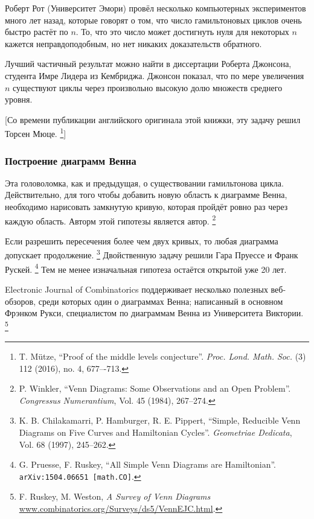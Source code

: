 Роберт Рот (Университет Эмори) провёл несколько компьютерных экспериментов много лет назад, которые говорят о том, что число гамильтоновых циклов очень быстро растёт по $n$.
То, что это число может достигнуть нуля для некоторых $n$ кажется неправдоподобным, но нет никаких доказательств обратного.

Лучший частичный результат можно найти в диссертации Роберта Джонсона, студента Имре Лидера из Кембриджа.
Джонсон показал, что по мере увеличения $n$ существуют циклы через произвольно высокую долю множеств среднего уровня.

[Со времени публикации английского оригинала этой книжки, эту задачу решил Торсен Мюце.
\footnote{T. Mütze, 
``Proof of the middle levels conjecture''.
\emph{Proc. Lond. Math. Soc.} (3) 112 (2016), no. 4, 677–-713.}]

\subsubsection*{Построение диаграмм Венна}

Эта головоломка, как и предыдущая, о существовании гамильтонова цикла. 
Действительно, для того чтобы добавить новую область к диаграмме Венна, необходимо нарисовать замкнутую кривую, которая пройдёт ровно раз через каждую область.
Авторм этой гипотезы является автор.%
\footnote{P. Winkler, ``Venn Diagrams: Some Observations and an Open Problem''. \emph{Congressus Numerantium}, Vol. 45 (1984), 267--274.}

Если разрешить пересечения более чем двух кривых, то любая диаграмма допускает продолжение.%
\footnote{K. B. Chilakamarri, P. Hamburger, R. E. Pippert,
``Simple, Reducible Venn Diagrams on Five Curves and Hamiltonian Cycles''. \emph{Geometriae Dedicata}, Vol. 68 (1997), 245--262.}
Двойственную задачу решили Гара Пруессе и Франк Рускей.%
\footnote{
G. Pruesse, F. Ruskey,
``All Simple Venn Diagrams are Hamiltonian''.
\texttt{arXiv:1504.06651 [math.CO]}.
}
Тем не менее изначальная гипотеза остаётся открытой уже 20 лет.

Electronic Journal of Combinatorics поддерживает несколько полезных веб-обзоров, среди которых один о диаграммах Венна; написанный в основном Фрэнком Рукси, специалистом по диаграммам Венна из Университета Виктории.%
\footnote{F. Ruskey, M. Weston, \emph{A Survey of Venn Diagrams} \href{http://www.combinatorics.org/Surveys/ds5/VennEJC.html}{\url{www.combinatorics.org/Surveys/ds5/VennEJC.html}}.}

